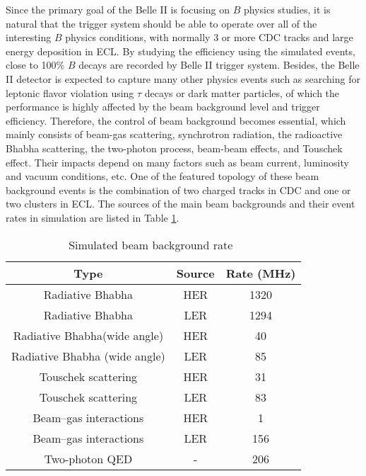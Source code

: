 Since the primary goal of the Belle II is focusing on $B$ physics studies, it is natural that the trigger system should be able to operate over all of the interesting $B$ physics conditions, with normally 3 or more CDC tracks and large energy deposition in ECL. By studying the efficiency using the simulated events, close to 100\% $B$ decays are recorded by Belle II trigger system. Besides, the Belle II detector is expected to capture many other physics events such as searching for leptonic flavor violation using $\tau$ decays or dark matter particles, of which the performance is highly affected by the beam background level and trigger efficiency. Therefore, the control of beam background becomes essential, which mainly consists of beam-gas scattering, synchrotron radiation, the radioactive Bhabha scattering, the two-photon process, beam-beam effects, and Touschek effect. Their impacts depend on many factors such as beam current, luminosity and vacuum conditions, etc. One of the featured topology of these beam background events is the combination of two charged tracks in CDC and one or two clusters in ECL. The sources of the main beam backgrounds and their event rates in simulation are listed in Table \ref{tab:BG}.

\begin{table}[htbp]
	\centering
	\large
	\caption{Simulated beam background rate~\cite{b2book}}
	\label{tab:BG}
	\begin{tabular}{c c c}
		\toprule
		Type & Source & Rate (MHz)\\
		\hline
		Radiative Bhabha & HER &  1320\\
		Radiative Bhabha & LER &  1294\\
		Radiative Bhabha(wide angle) & HER &  40\\
		Radiative Bhabha (wide angle) & LER &  85\\
		Touschek scattering & HER &  31\\
		Touschek scattering & LER &  83\\
		Beam–gas interactions & HER &  1\\
		Beam–gas interactions & LER &  156\\
		Two-photon QED & - & 206\\
		\bottomrule
	\end{tabular}
\end{table}
\begin{comment}
The improvements on both L1, HLT and the DAQ system are dedicated to serve the operation of the Belle II detector with much higher event rate in future. The further upgrades are also considered such as the replacement of the current DAQ module (COPPER board\cite{Abe:2010gxa} on the read-out PCs) with the latest PCIe-40 platform\cite{mitra2016gbt} to enlarge the bandwidth between detector front-end electronics and the event builder in Figure \ref{fig:daq}.
\end{comment}



